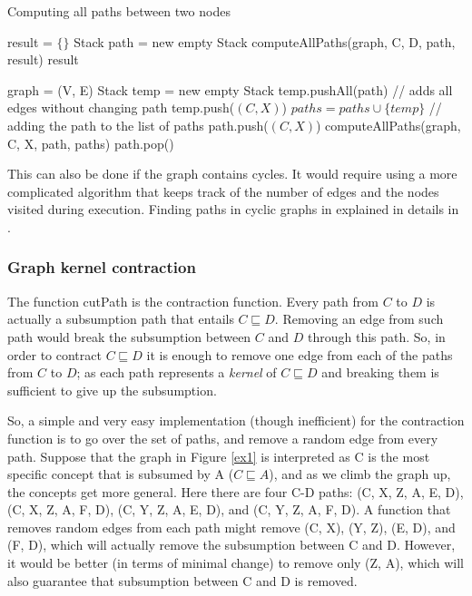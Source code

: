 \documentclass{sfuthesis}
\theoremstyle{plain}
\theoremstyle{definition}
\begin{document}
\begin{algorithm}
\caption{Computing all paths between two nodes}
\label{GetPaths}
\begin{algorithmic}[1]
\State result = $\{\}$
\State Stack path = new empty Stack
\State computeAllPaths(graph, C, D, path, result)
\State \Return result
\EndFunction
\end{algorithmic}

\begin{algorithmic}[1]
\State graph = (V, E)
\State Stack temp = new empty Stack
\State temp.pushAll(path)  // adds all edges without changing path
\State temp.push($(C, X)$)
\State $paths = paths \cup \{temp\}$  // adding the path to the list of paths
\Else
\State path.push($(C, X)$)
\State computeAllPaths(graph, C, X, path, paths)
\State path.pop()
\EndIf
\EndFor
\EndFunction
\end{algorithmic}
\end{algorithm}

This can also be done if the graph contains cycles. It would require using a more complicated algorithm that keeps track of the number of edges and the nodes visited during execution. Finding paths in cyclic graphs in explained in details in \cite{alg}.

\subsubsection{Graph kernel contraction}
The function cutPath is the contraction function. Every path from $C$ to $D$ is actually a subsumption path that entails $C \sqsubseteq D$. Removing an edge from such path would break the subsumption between $C$ and $D$ through this path. So, in order to contract $C \sqsubseteq D$ it is enough to remove one edge from each of the paths from $C$ to $D$; as each path represents a \textit{kernel} of $C \sqsubseteq D$ and breaking them is sufficient to give up the subsumption. 

So, a simple and very easy implementation (though inefficient) for the contraction function is to go over the set of paths, and remove a random edge from every path. Suppose that the graph in Figure \ref{ex1} is interpreted as C is the most specific concept that is subsumed by A ($C \sqsubseteq A$), and as we climb the graph up, the concepts get more general. Here there are four C-D paths: (C, X, Z, A, E, D), (C, X, Z, A, F, D), (C, Y, Z, A, E, D), and (C, Y, Z, A, F, D). A function that removes random edges from each path might remove (C, X), (Y, Z), (E, D), and (F, D), which will actually remove the subsumption between C and D. However, it would be better (in terms of minimal change) to remove only (Z, A), which will also guarantee that subsumption between C and D is removed.
\end{document}
